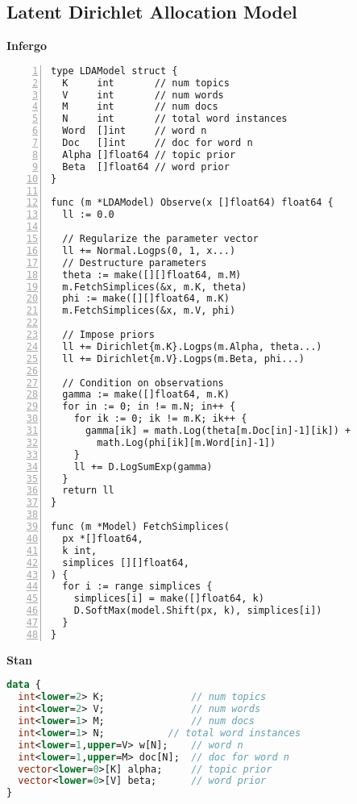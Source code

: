 \documentclass[sigplan,10pt,screen]{acmart}
\begin{document}


\clearpage
\appendix

\begin{figure*}
\section{Latent Dirichlet Allocation Model}
  \label{app:lda}
\vspace{\baselineskip}

\begin{minipage}[t]{0.49\textwidth}
\centering
\textbf{Infergo}

\begin{lstlisting}[framexleftmargin=10pt,numbers=left]
type LDAModel struct {
  K     int       // num topics
  V     int       // num words
  M     int       // num docs
  N     int       // total word instances
  Word  []int     // word n
  Doc   []int     // doc for word n
  Alpha []float64 // topic prior
  Beta  []float64 // word prior
}

func (m *LDAModel) Observe(x []float64) float64 {
  ll := 0.0

  // Regularize the parameter vector
  ll += Normal.Logps(0, 1, x...)
  // Destructure parameters
  theta := make([][]float64, m.M)
  m.FetchSimplices(&x, m.K, theta)
  phi := make([][]float64, m.K)
  m.FetchSimplices(&x, m.V, phi)

  // Impose priors
  ll += Dirichlet{m.K}.Logps(m.Alpha, theta...)
  ll += Dirichlet{m.V}.Logps(m.Beta, phi...)

  // Condition on observations
  gamma := make([]float64, m.K)
  for in := 0; in != m.N; in++ {
    for ik := 0; ik != m.K; ik++ {
      gamma[ik] = math.Log(theta[m.Doc[in]-1][ik]) +
        math.Log(phi[ik][m.Word[in]-1])
    }
    ll += D.LogSumExp(gamma)
  }
  return ll
}

func (m *Model) FetchSimplices(
  px *[]float64,
  k int,
  simplices [][]float64,
) {
  for i := range simplices {
    simplices[i] = make([]float64, k)
    D.SoftMax(model.Shift(px, k), simplices[i])
  }
}
\end{lstlisting}
\end{minipage}
\hfill
\begin{minipage}[t]{0.49\textwidth}
  \centering
  
  \textbf{Stan}

\begin{lstlisting}[language=Stan]
data {
  int<lower=2> K;               // num topics
  int<lower=2> V;               // num words
  int<lower=1> M;               // num docs
  int<lower=1> N;           // total word instances
  int<lower=1,upper=V> w[N];    // word n
  int<lower=1,upper=M> doc[N];  // doc for word n
  vector<lower=0>[K] alpha;     // topic prior
  vector<lower=0>[V] beta;      // word prior
}



\end{lstlisting}
\end{minipage}
\end{figure*}
\end{document}
